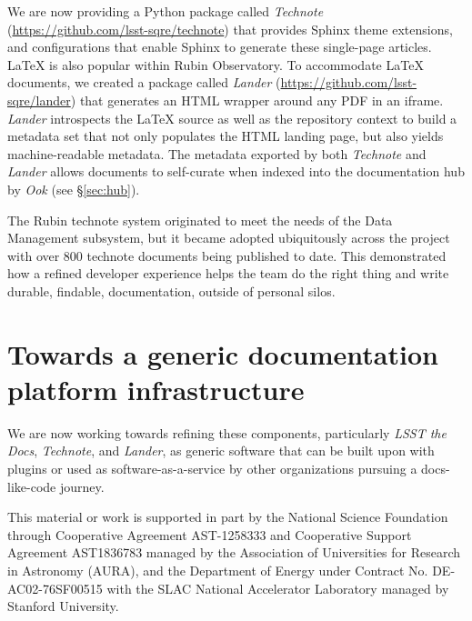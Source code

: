\documentclass[11pt,twoside]{article}
\begin{document}
We are now providing a Python package called \textit{Technote} (\url{https://github.com/lsst-sqre/technote}) that provides Sphinx theme extensions, and configurations that enable Sphinx to generate these single-page articles.
LaTeX is also popular within Rubin Observatory.
To accommodate LaTeX documents, we created a package called \textit{Lander} (\url{https://github.com/lsst-sqre/lander}) that generates an HTML wrapper around any PDF in an iframe.
\textit{Lander} introspects the LaTeX source as well as the repository context to build a metadata set that not only populates the HTML landing page, but also yields machine-readable metadata.
The metadata exported by both \textit{Technote} and \textit{Lander} allows documents to self-curate when indexed into the documentation hub by \textit{Ook} (see \S\ref{sec:hub}).

The Rubin technote system originated to meet the needs of the Data Management subsystem, but it became adopted ubiquitously across the project with over 800 technote documents being published to date.
This demonstrated how a refined developer experience helps the team do the right thing and write durable, findable, documentation, outside of personal silos.

\section{Towards a generic documentation platform infrastructure}

We are now working towards refining these components, particularly \textit{LSST the Docs}, \textit{Technote}, and \textit{Lander}, as generic software that can be built upon with plugins or used as software-as-a-service by other organizations pursuing a docs-like-code journey.

\acknowledgements This material or work is supported in part by the National Science Foundation through Cooperative Agreement AST-1258333 and Cooperative Support Agreement AST1836783 managed by the Association of Universities for Research in Astronomy (AURA), and the Department of Energy under Contract No. DE-AC02-76SF00515 with the SLAC National Accelerator Laboratory managed by Stanford University.



\end{document}

